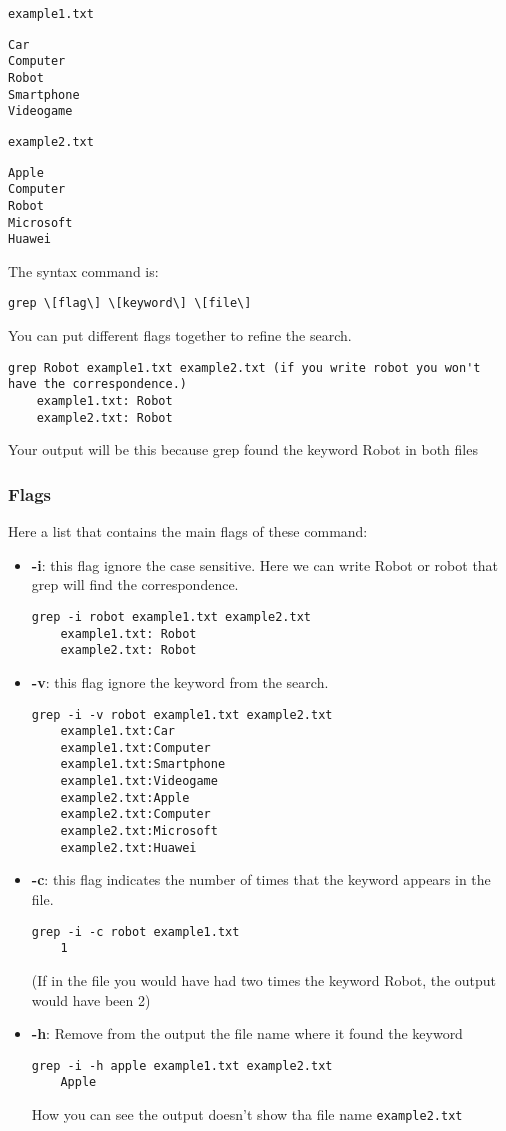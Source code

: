 \documentclass[hidelinks,12pt,a4paper,numbers=enddot]{scrartcl}
\begin{document}
\texttt{example1.txt}
\begin{verbatim}
Car
Computer
Robot
Smartphone
Videogame
\end{verbatim}

\texttt{example2.txt}
\begin{verbatim}
Apple
Computer
Robot
Microsoft
Huawei
\end{verbatim}

The syntax command is:
\begin{verbatim}grep \[flag\] \[keyword\] \[file\]\end{verbatim}
You can put different flags together to refine the search.

\begin{verbatim}
grep Robot example1.txt example2.txt (if you write robot you won't have the correspondence.)
    example1.txt: Robot
    example2.txt: Robot
\end{verbatim}

Your output will be this because grep found the keyword Robot in both files

\subsubsection{Flags}

Here a list that contains the main flags of these command:

\begin{itemize}
    \item  \textbf{-i}: this flag ignore the case sensitive. Here we can write Robot or
        robot that grep will find the correspondence.
\begin{verbatim}
grep -i robot example1.txt example2.txt
    example1.txt: Robot
    example2.txt: Robot
\end{verbatim}
    

    \item  \textbf{-v}: this flag ignore the keyword from the search.
\begin{verbatim}
grep -i -v robot example1.txt example2.txt
    example1.txt:Car
    example1.txt:Computer
    example1.txt:Smartphone
    example1.txt:Videogame
    example2.txt:Apple
    example2.txt:Computer
    example2.txt:Microsoft
    example2.txt:Huawei
\end{verbatim}
    

    \item  \textbf{-c}: this flag indicates the number of times that the keyword appears in the file.
\begin{verbatim}
grep -i -c robot example1.txt
    1
\end{verbatim}
    (If in the file you would have had two times the keyword Robot, the output would have been 2)
    

    \item  \textbf{-h}: Remove from the output the file name where it found the keyword
\begin{verbatim}
grep -i -h apple example1.txt example2.txt
    Apple
\end{verbatim}
    How you can see the output doesn't show tha file name \texttt{example2.txt}
    
\end{itemize}
\end{document}
